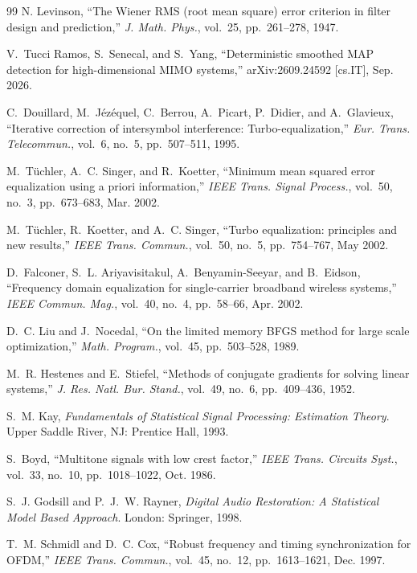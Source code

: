 \documentclass[11pt,a4paper]{article}
\theoremstyle{remark}
\begin{document}
\begin{thebibliography}{99}
N. Levinson, ``The Wiener RMS (root mean square) error criterion in filter design and prediction,'' \emph{J. Math. Phys.}, vol.~25, pp.~261--278, 1947.

V.~Tucci Ramos, S.~Senecal, and S.~Yang, ``Deterministic smoothed MAP detection for high-dimensional MIMO systems,'' arXiv:2609.24592 [cs.IT], Sep. 2026.

C.~Douillard, M.~J\'ez\'equel, C.~Berrou, A.~Picart, P.~Didier, and A.~Glavieux, ``Iterative correction of intersymbol interference: Turbo-equalization,'' \emph{Eur. Trans. Telecommun.}, vol.~6, no.~5, pp.~507--511, 1995.

M.~T\"uchler, A.~C. Singer, and R.~Koetter, ``Minimum mean squared error equalization using a priori information,'' \emph{IEEE Trans. Signal Process.}, vol.~50, no.~3, pp.~673--683, Mar. 2002.

M.~T\"uchler, R.~Koetter, and A.~C. Singer, ``Turbo equalization: principles and new results,'' \emph{IEEE Trans. Commun.}, vol.~50, no.~5, pp.~754--767, May 2002.

D.~Falconer, S.~L. Ariyavisitakul, A.~Benyamin-Seeyar, and B.~Eidson, ``Frequency domain equalization for single-carrier broadband wireless systems,'' \emph{IEEE Commun. Mag.}, vol.~40, no.~4, pp.~58--66, Apr. 2002.

D.~C. Liu and J.~Nocedal, ``On the limited memory BFGS method for large scale optimization,'' \emph{Math. Program.}, vol.~45, pp.~503--528, 1989.

M.~R. Hestenes and E.~Stiefel, ``Methods of conjugate gradients for solving linear systems,'' \emph{J. Res. Natl. Bur. Stand.}, vol.~49, no.~6, pp.~409--436, 1952.

S.~M. Kay, \emph{Fundamentals of Statistical Signal Processing: Estimation Theory}. Upper Saddle River, NJ: Prentice Hall, 1993.

S.~Boyd, ``Multitone signals with low crest factor,'' \emph{IEEE Trans. Circuits Syst.}, vol.~33, no.~10, pp.~1018--1022, Oct. 1986.

S.~J. Godsill and P.~J.~W. Rayner, \emph{Digital Audio Restoration: A Statistical Model Based Approach}. London: Springer, 1998.

T.~M. Schmidl and D.~C. Cox, ``Robust frequency and timing synchronization for OFDM,'' \emph{IEEE Trans. Commun.}, vol.~45, no.~12, pp.~1613--1621, Dec. 1997.


\end{thebibliography}
\end{document}
